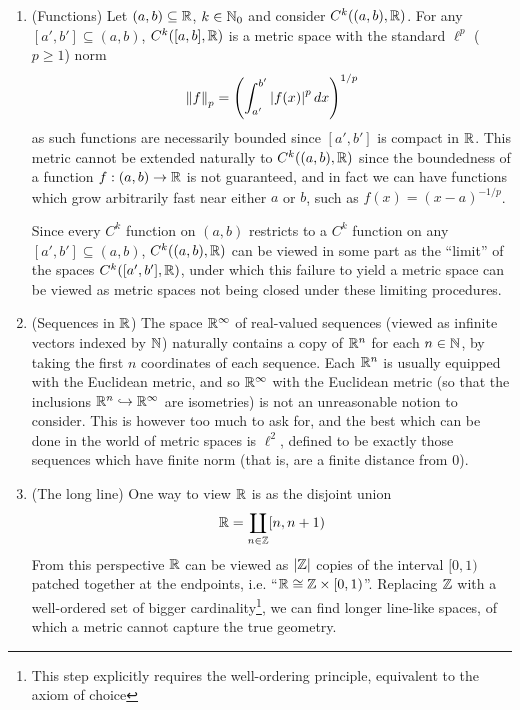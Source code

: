 \documentclass[11pt]{article}
\begin{document}
\begin{example}\label{nonmetric}
    \begin{enumerate}
        \item (Functions) Let $(a, b) \subseteq \mathbb{R}$, $k \in \mathbb{N}_0$ and consider $C^k((a, b), \mathbb{R})$. For any $[a', b'] \subseteq (a, b)$, $C^k([a, b], \mathbb{R})$ is a metric space with the standard $\ell^p$ ($p \geq 1$) norm
        $$
            \left\| f \right\|_p = \left(  \int_{a'}^{b'}\left| f(x) \right|^p dx  \right)^{1/p}
        $$
        as such functions are necessarily bounded since $[a', b']$ is compact in $\mathbb{R}$. This metric cannot be extended naturally to $C^k((a, b), \mathbb{R})$ since the boundedness of a function $f : (a, b) \to \mathbb{R}$ is not guaranteed, and in fact we can have functions which grow arbitrarily fast near either $a$ or $b$, such as $f(x) = (x - a)^{-1/p}$. 
        
        Since every $C^k$ function on $(a, b)$ restricts to a $C^k$ function on any $[a', b'] \subseteq (a, b)$, $C^k((a, b), \mathbb{R})$ can be viewed in some part as the ``limit'' of the spaces $C^k([a', b'], \mathbb{R})$, under which this failure to yield a metric space can be viewed as metric spaces not being closed under these limiting procedures.
        \item (Sequences in $\mathbb{R}$) The space $\mathbb{R}^\infty$ of real-valued sequences (viewed as infinite vectors indexed by $\mathbb{N}$) naturally contains a copy of $\mathbb{R}^n$ for each $n \in \mathbb{N}$, by taking the first $n$ coordinates of each sequence. Each $\mathbb{R}^n$ is usually equipped with the Euclidean metric, and so $\mathbb{R}^\infty$ with the Euclidean metric (so that the inclusions $\mathbb{R}^n \hookrightarrow \mathbb{R}^\infty$ are isometries) is not an unreasonable notion to consider. This is however too much to ask for, and the best which can be done in the world of metric spaces is $\ell^2$, defined to be exactly those sequences which have finite norm (that is, are a finite distance from $0$).
        \item (The long line) One way to view $\mathbb{R}$ is as the disjoint union
        $$
            \mathbb{R} = \coprod_{n \in \mathbb{Z}}[n, n + 1)
        $$
        From this perspective $\mathbb{R}$ can be viewed as $\left| \mathbb{Z} \right|$ copies of the interval $[0, 1)$ patched together at the endpoints, i.e. ``$\mathbb{R} \cong \mathbb{Z} \times [0, 1)$''. Replacing $\mathbb{Z}$ with a well-ordered set of bigger cardinality\footnote{This step explicitly requires the well-ordering principle, equivalent to the axiom of choice}, we can find longer line-like spaces, of which a metric cannot capture the true geometry.
    \end{enumerate}
\end{example}
\end{document}
